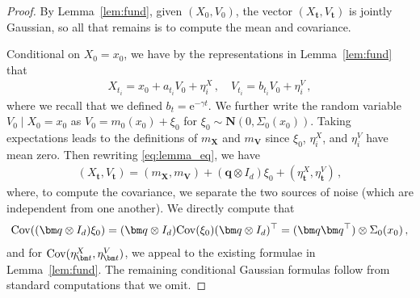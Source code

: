 \documentclass[12pt]{article}
\theoremstyle{plain}
\theoremstyle{plain}
\theoremstyle{remark}
\newcommand{\rme}{\mathrm{e}}
\newcommand{\gauss}{\mathbf{N}}
\newcommand{\1}{\bm{1}}
\theoremstyle{plain}
\theoremstyle{definition}
\theoremstyle{remark}
\begin{document}
\begin{proof}
By Lemma~\ref{lem:fund}, given $(X_0,V_0)$, the vector $( X_{\bm{t}},V_{\bm{t}})$ is jointly
Gaussian, so all that remains is to compute the mean and covariance.

Conditional on $X_0 = x_0$, we have by the representations in Lemma~\ref{lem:fund} that
\begin{align}\label{eq:lemma_eq}
    X_{t_i} = x_0 + a_{t_i} V_0 + \eta_i^X\,, \quad V_{t_i} = b_{t_i} V_0 + \eta_i^V\,,
\end{align}
where we recall that we defined $b_t = \rme^{-\gamma t}$. We further write the random variable $V_0\mid X_0 = x_0$ as $V_0 = m_0(x_0) + \xi_0$ for $\xi_0 \sim {\gauss}(0,\Sigma_0(x_0))$. Taking expectations leads to the definitions of $m_{\bm X}$ and $m_{\bm V}$ since $\xi_0$, $\eta_i^X$, and $\eta_i^V$ have mean zero. Then rewriting \eqref{eq:lemma_eq}, we have
\begin{align*}
    (X_{\bm t}, V_{\bm t}) = (m_{\bm X}, m_{\bm V}) + (\bm q \otimes I_d)\xi_0 + (\eta_{\bm t}^X, \eta_{\bm t}^V)\,,
\end{align*}
where, to compute the covariance, we separate the two sources of noise (which are independent from one another). We directly compute that
\begin{align*}
    {\rm Cov}((\bm q \otimes I_d)\xi_0) = (\bm q \otimes I_d){\rm Cov}(\xi_0)(\bm q \otimes I_d)^\top = (\bm q \bm q^\top)\otimes \Sigma_0(x_0)\,,
\end{align*}
and for ${\rm Cov}(\eta_{\bm t}^X, \eta_{\bm t}^V)$, we appeal to the existing formulae in Lemma~\ref{lem:fund}. The remaining conditional Gaussian formulas follow from standard computations that we omit.
\end{proof}
\end{document}
